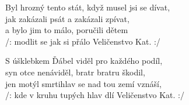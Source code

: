 \vspace{-2pt}
\ve{}
Byl hrozný tento stát, když musel jsi se dívat,\\
jak zakázali psát a zakázali zpívat,\\
a bylo jim to málo, poručili dětem\\
/: modlit se jak si přálo Veličenstvo Kat. :/

\vspace{-2pt}
\ve{}
S úšklebkem Ďábel viděl pro každého podíl,\\
syn otce nenáviděl, bratr bratru škodil,\\
jen motýl smrtihlav se nad tou zemí vznáší,\\
/: kde v kruhu tupých hlav dlí Veličenstvo Kat. :/ 
\esong
\pagestyle{plain}
\restoregeometry